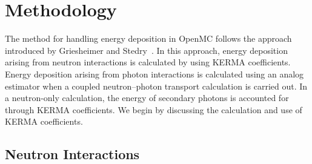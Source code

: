 \documentclass{anstrans}
\begin{document}
\section{Methodology}

The method for handling energy deposition in OpenMC follows the approach
introduced by Griesheimer and Stedry~\cite{griesheimer2013mc}. In this approach,
energy deposition arising from neutron interactions is calculated by using KERMA
coefficients. Energy deposition arising from photon interactions is calculated
using an analog estimator when a coupled neutron--photon transport calculation
is carried out. In a neutron-only calculation, the energy of secondary photons
is accounted for through KERMA coefficients. We begin by discussing the
calculation and use of KERMA coefficients.

\subsection{Neutron Interactions}
\end{document}
